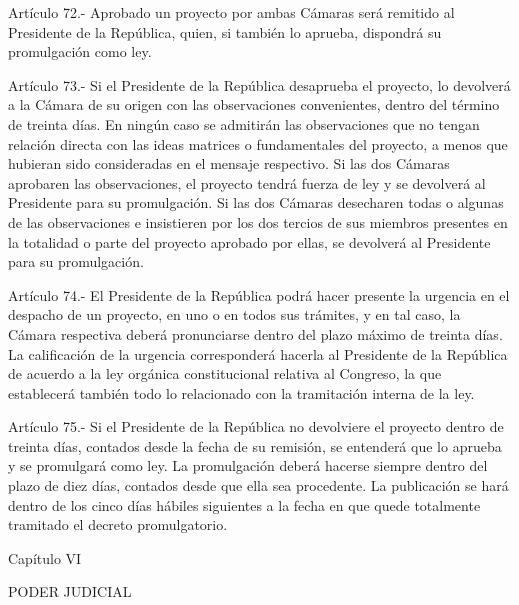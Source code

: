     Artículo 72.- Aprobado un proyecto por ambas Cámaras será remitido al Presidente de la República, quien, si también lo aprueba, dispondrá su promulgación como ley.



    Artículo 73.- Si el Presidente de la República desaprueba el proyecto, lo devolverá a la Cámara de su origen con las observaciones convenientes, dentro del término de treinta días.
    En ningún caso se admitirán las observaciones que no tengan relación directa con las ideas matrices o fundamentales del proyecto, a menos que hubieran sido consideradas en el mensaje respectivo.
    Si las dos Cámaras aprobaren las observaciones, el proyecto tendrá fuerza de ley y se devolverá al Presidente para su promulgación.
    Si las dos Cámaras desecharen todas o algunas de las observaciones e insistieren por los dos tercios de sus miembros presentes en la totalidad o parte del proyecto aprobado por ellas, se devolverá al Presidente para su promulgación.



    Artículo 74.- El Presidente de la República podrá hacer presente la urgencia en el despacho de un proyecto, en uno o en todos sus trámites, y en tal caso, la Cámara respectiva deberá pronunciarse dentro del plazo máximo de treinta días.
    La calificación de la urgencia corresponderá hacerla al Presidente de la República de acuerdo a la ley orgánica constitucional relativa al Congreso, la que establecerá también todo lo relacionado con la tramitación interna de la ley.



    Artículo 75.- Si el Presidente de la República no devolviere el proyecto dentro de treinta días, contados desde la fecha de su remisión, se entenderá que lo aprueba y se promulgará como ley.
    La promulgación deberá hacerse siempre dentro del plazo de diez días, contados desde que ella sea procedente.
    La publicación se hará dentro de los cinco días hábiles siguientes a la fecha en que quede totalmente tramitado el decreto promulgatorio.



    Capítulo VI

    PODER JUDICIAL



